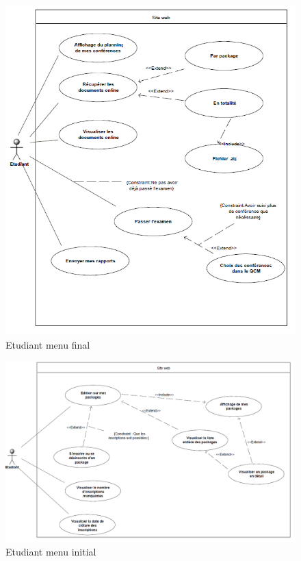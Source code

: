    \begin{figure}[h]
        \begin{center}
            \includegraphics[scale=0.50]{images/uml/etudiantMenuFinal.png} 
        \end{center}

        \caption{Etudiant menu final}
        \label{Etudiant menu final}
    \end{figure}

    \begin{figure}[h]
        \begin{center}
            \includegraphics[scale=0.50]{images/uml/etudiantMenuInitial.png} 
        \end{center}

        \caption{Etudiant menu initial}
        \label{Etudiant menu initial}
    \end{figure}

